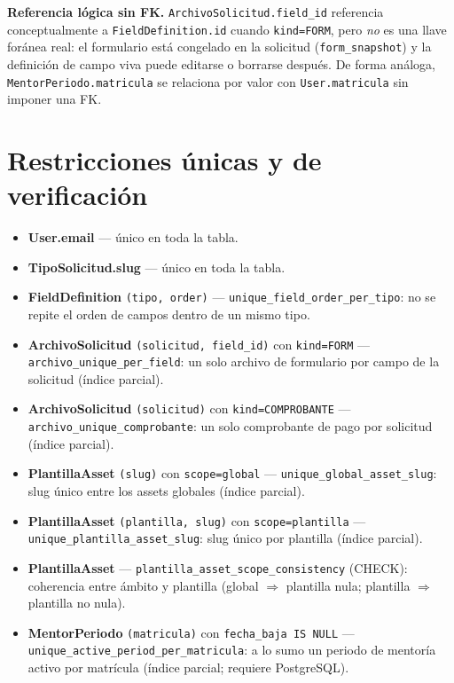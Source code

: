 \documentclass[12pt,letterpaper]{report}
\begin{document}
\noindent\textbf{Referencia lógica sin FK.} \texttt{ArchivoSolicitud.field\_id}
referencia conceptualmente a \texttt{FieldDefinition.id} cuando
\texttt{kind=FORM}, pero \emph{no} es una llave foránea real: el formulario está
congelado en la solicitud (\texttt{form\_snapshot}) y la definición de campo
viva puede editarse o borrarse después. De forma análoga,
\texttt{MentorPeriodo.matricula} se relaciona por valor con
\texttt{User.matricula} sin imponer una FK.

\section{Restricciones únicas y de verificación}

\begin{itemize}[leftmargin=1.4em]
  \item \textbf{User.email} --- único en toda la tabla.
  \item \textbf{TipoSolicitud.slug} --- único en toda la tabla.
  \item \textbf{FieldDefinition} \texttt{(tipo, order)} ---
        \texttt{unique\_field\_order\_per\_tipo}: no se repite el orden de
        campos dentro de un mismo tipo.
  \item \textbf{ArchivoSolicitud} \texttt{(solicitud, field\_id)} con
        \texttt{kind=FORM} --- \texttt{archivo\_unique\_per\_field}: un solo
        archivo de formulario por campo de la solicitud (índice parcial).
  \item \textbf{ArchivoSolicitud} \texttt{(solicitud)} con
        \texttt{kind=COMPROBANTE} --- \texttt{archivo\_unique\_comprobante}: un
        solo comprobante de pago por solicitud (índice parcial).
  \item \textbf{PlantillaAsset} \texttt{(slug)} con \texttt{scope=global} ---
        \texttt{unique\_global\_asset\_slug}: slug único entre los assets
        globales (índice parcial).
  \item \textbf{PlantillaAsset} \texttt{(plantilla, slug)} con
        \texttt{scope=plantilla} --- \texttt{unique\_plantilla\_asset\_slug}:
        slug único por plantilla (índice parcial).
  \item \textbf{PlantillaAsset} --- \texttt{plantilla\_asset\_scope\_consistency}
        (CHECK): coherencia entre ámbito y plantilla (global $\Rightarrow$
        plantilla nula; plantilla $\Rightarrow$ plantilla no nula).
  \item \textbf{MentorPeriodo} \texttt{(matricula)} con
        \texttt{fecha\_baja IS NULL} ---
        \texttt{unique\_active\_period\_per\_matricula}: a lo sumo un periodo de
        mentoría activo por matrícula (índice parcial; requiere PostgreSQL).
\end{itemize}
\end{document}
